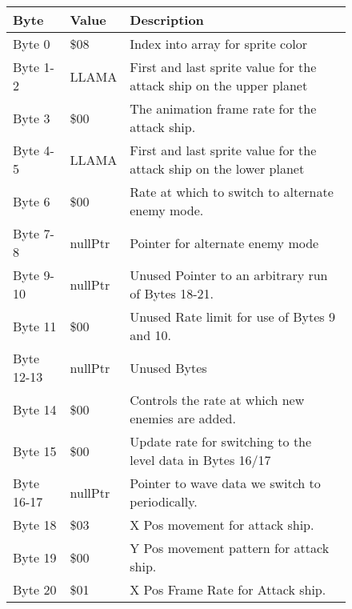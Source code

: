 \begin{figure}[H]
  {
  \setlength{\tabcolsep}{3.0pt}
  \setlength\cmidrulewidth{\heavyrulewidth} %
  \begin{adjustbox}{width=12cm}

\begin{tabular}{lll}
\toprule
 Byte       & Value              & Description                                                         \\
\midrule
 Byte 0     & \$08                & Index into array for sprite color                                   \\
 Byte 1-2   & LLAMA              & First and last sprite value for the attack ship on the upper planet \\
 Byte 3     & \$00                & The animation frame rate for the attack ship.                       \\
 Byte 4-5   & LLAMA              & First and last sprite value for the attack ship on the lower planet \\
 Byte 6     & \$00                & Rate at which to switch to alternate enemy mode.                    \\
 Byte 7-8   & nullPtr            & Pointer for alternate enemy mode                                    \\
 Byte 9-10  & nullPtr            & Unused Pointer to an arbitrary run of Bytes 18-21.                  \\
 Byte 11    & \$00                & Unused Rate limit for use of Bytes 9 and 10.                        \\
 Byte 12-13 & nullPtr            & Unused Bytes                                                        \\
 Byte 14    & \$00                & Controls the rate at which new enemies are added.                   \\
 Byte 15    & \$00                & Update rate for switching to the level data in Bytes 16/17          \\
 Byte 16-17 & nullPtr            & Pointer to wave data we switch to periodically.                     \\
 Byte 18    & \$03                & X Pos movement for attack ship.                                     \\
 Byte 19    & \$00                & Y Pos movement pattern for attack ship.                             \\
 Byte 20    & \$01                & X Pos Frame Rate for Attack ship.                                   \\

\end{tabular}
\end{adjustbox}}
\end{figure}
